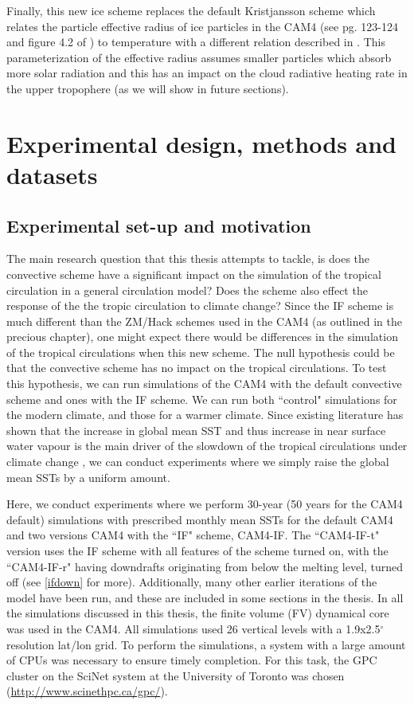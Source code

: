 \documentclass[letterpaper,12pt,titlepage,oneside,final]{book}
\begin{document}
Finally, this new ice scheme replaces the default Kristjansson scheme which relates the particle effective radius of ice particles \citep{kristjansson_impact_2000} in the CAM4 (see pg. 123-124 and figure 4.2 of \cite{neale_description_2010}) to temperature with a different relation described in \citep{garrett_small_2003}. This parameterization of the effective radius assumes smaller particles which absorb more solar radiation and this has an impact on the cloud radiative heating rate in the upper tropophere (as we will show in future sections). 
\chapter{Experimental design, methods and datasets}

\section{Experimental set-up and motivation}

The main research question that this thesis attempts to tackle, is does the convective scheme have a significant impact on the simulation of the tropical circulation in a general circulation model? Does the scheme also effect the response of the the tropic circulation to climate change? Since the IF scheme is much different than the ZM/Hack schemes used in the CAM4 (as outlined in the precious chapter), one might expect there would be differences in the simulation of the tropical circulations when this new scheme. The null hypothesis could be that the convective scheme has no impact on the tropical circulations. To test this hypothesis, we can run simulations of the CAM4 with the default convective scheme and ones with the IF scheme. We can run both ``control" simulations for the modern climate, and those for a warmer climate. Since existing literature has shown that the increase in global mean SST and thus increase in near surface water vapour is the main driver of the slowdown of the tropical circulations under climate change \citep{held_robust_2006,ma_mechanisms_2011,vecchi_global_2007,he_anthropogenic_2015}, we can conduct experiments where we simply raise the global mean SSTs by a uniform amount.

Here, we conduct experiments where we perform 30-year (50 years for the CAM4 default) simulations with prescribed monthly mean SSTs for the default CAM4 and two versions CAM4 with the ``IF" scheme, CAM4-IF. The ``CAM4-IF-t" version uses the IF scheme with all features of the scheme turned on, with the ``CAM4-IF-r" having downdrafts originating from below the melting level, turned off (see \ref{ifdown} for more). Additionally, many other earlier iterations of the model have been run, and these are included in some sections in the thesis. In all the simulations discussed in this thesis, the finite volume (FV) dynamical core was used in the CAM4. All simulations used 26 vertical levels with a 1.9x2.5$^{\circ}$ resolution lat/lon grid. To perform the simulations, a system with a large amount of CPUs was necessary to ensure timely completion. For this task, the GPC cluster on the SciNet system at the University of Toronto was chosen (\url{http://www.scinethpc.ca/gpc/}). 
\end{document}
